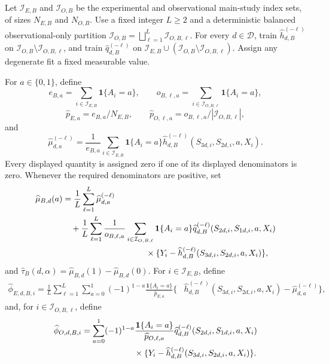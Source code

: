 Let \(\mathcal I_{E,B}\) and \(\mathcal I_{O,B}\) be the experimental and observational main-study index sets, of sizes \(N_{E,B}\) and \(N_{O,B}\). Use a fixed integer \(L\ge2\) and a deterministic balanced observational-only partition \(\mathcal I_{O,B}=\bigsqcup_{\ell=1}^L\mathcal I_{O,B,\ell}\). For every \(d\in\mathcal D\), train \(\widehat h_{d,B}^{(-\ell)}\) on \(\mathcal I_{O,B}\setminus\mathcal I_{O,B,\ell}\), and train \(\widehat q_{d,B}^{(-\ell)}\) on \(\mathcal I_{E,B}\cup(\mathcal I_{O,B}\setminus\mathcal I_{O,B,\ell})\). Assign any degenerate fit a fixed measurable value.

For \(a\in\{0,1\}\), define
\[
 e_{B,a}=\sum_{i\in\mathcal I_{E,B}}\mathbf 1\{A_i=a\},
 \qquad
 o_{B,\ell,a}=\sum_{i\in\mathcal I_{O,B,\ell}}\mathbf 1\{A_i=a\},
\]
\[
 \widehat p_{E,a}=e_{B,a}/N_{E,B},
 \qquad
 \widehat p_{O,\ell,a}=o_{B,\ell,a}/|\mathcal I_{O,B,\ell}|,
\]
and
\[
 \widehat\mu_{d,a}^{(-\ell)}
 =\frac1{e_{B,a}}\sum_{i\in\mathcal I_{E,B}}\mathbf 1\{A_i=a\}
 \widehat h_{d,B}^{(-\ell)}(S_{3d,i},S_{2d,i},a,X_i).
\]
Every displayed quantity is assigned zero if one of its displayed denominators is zero. Whenever the required denominators are positive, set
\[
\begin{aligned}
 \widehat\mu_{B,d}(a)
 &=\frac1L\sum_{\ell=1}^L\widehat\mu_{d,a}^{(-\ell)}\\
 &\quad+\frac1L\sum_{\ell=1}^L\frac1{o_{B,\ell,a}}
 \sum_{i\in\mathcal I_{O,B,\ell}}\mathbf 1\{A_i=a\}
 \widehat q_{d,B}^{(-\ell)}(S_{2d,i},S_{1d,i},a,X_i)\\
 &\hspace{35mm}\times
 \{Y_i-\widehat h_{d,B}^{(-\ell)}(S_{3d,i},S_{2d,i},a,X_i)\},
\end{aligned}
\]
and \(\widehat\tau_B(d,\alpha)=\widehat\mu_{B,d}(1)-\widehat\mu_{B,d}(0)\). For \(i\in\mathcal I_{E,B}\), define
\[
\begin{aligned}
 \widehat\phi_{E,d,B,i}
 =\frac1L\sum_{\ell=1}^L\sum_{a=0}^1(-1)^{1-a}
 \frac{\mathbf 1\{A_i=a\}}{\widehat p_{E,a}}
 \{&\widehat h_{d,B}^{(-\ell)}(S_{3d,i},S_{2d,i},a,X_i)
 -\widehat\mu_{d,a}^{(-\ell)}\},
\end{aligned}
\]
and, for \(i\in\mathcal I_{O,B,\ell}\), define
\[
\begin{aligned}
 \widehat\phi_{O,d,B,i}
 &=\sum_{a=0}^1(-1)^{1-a}
 \frac{\mathbf 1\{A_i=a\}}{\widehat p_{O,\ell,a}}
 \widehat q_{d,B}^{(-\ell)}(S_{2d,i},S_{1d,i},a,X_i)\\
 &\hspace{22mm}\times
 \{Y_i-\widehat h_{d,B}^{(-\ell)}(S_{3d,i},S_{2d,i},a,X_i)\}.
\end{aligned}
\]
